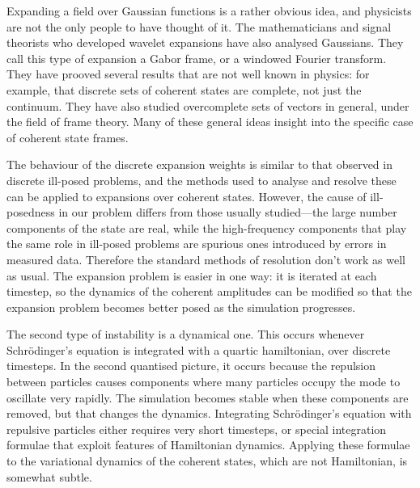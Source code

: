 Expanding a field over Gaussian functions is a rather obvious idea, and physicists are not the only people to have thought of it.  The mathematicians and signal theorists who developed wavelet expansions have also analysed Gaussians.  They call this type of expansion a Gabor frame, or a windowed Fourier transform.  They have prooved several results that are not well known in physics: for example, that discrete sets of coherent states are complete, not just the continuum.  They have also studied overcomplete sets of vectors in general, under the field of frame theory.  Many of these general ideas insight into the specific case of coherent state frames.

The behaviour of the discrete expansion weights is similar to that observed in discrete ill-posed problems, and the methods used to analyse and resolve these can be applied to expansions over coherent states.  However, the cause of ill-posedness in our problem differs from those usually studied—the large number components of the state are real, while the high-frequency components that play the same role in ill-posed problems are spurious ones introduced by errors in measured data.  Therefore the standard methods of resolution don't work as well as usual.  The expansion problem is easier in one way: it is iterated at each timestep, so the dynamics of the coherent amplitudes can be modified so that the expansion problem becomes better posed as the simulation progresses.

The second type of instability is a dynamical one.  This occurs whenever Schrödinger's equation is integrated with a quartic hamiltonian, over discrete timesteps.  In the second quantised picture, it occurs because the repulsion between particles causes components where many particles occupy the mode to oscillate very rapidly.  The simulation becomes stable when these components are removed, but that changes the dynamics.  Integrating Schrödinger's equation with repulsive particles either requires very short timesteps, or special integration formulae that exploit features of Hamiltonian dynamics.  Applying these formulae to the variational dynamics of the coherent states, which are not Hamiltonian, is somewhat subtle.


